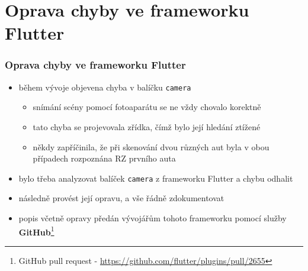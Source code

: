 \documentclass{beamer}
\begin{document}
\section{Oprava chyby ve frameworku Flutter}
\begin{frame}
\frametitle{Oprava chyby ve frameworku Flutter}
\begin{itemize}
    \item během vývoje objevena chyba v balíčku \texttt{camera}
    \begin{itemize}
        \item snímání scény pomocí fotoaparátu se ne vždy chovalo korektně
        \item tato chyba se projevovala zřídka, čímž bylo její hledání ztížené
        \item někdy zapříčinila, že při skenování dvou různých aut byla v obou případech rozpoznána RZ prvního auta
    \end{itemize}
    \item bylo třeba analyzovat balíček \texttt{camera} z frameworku Flutter a chybu odhalit
    \item následně provést její opravu, a vše řádně zdokumentovat
    \item popis včetně opravy předán vývojářům tohoto frameworku pomocí služby \textbf{GitHub}\footnote{GitHub pull request - \url{https://github.com/flutter/plugins/pull/2655}}
\end{itemize}
\end{frame}
\end{document}

